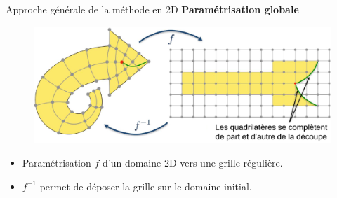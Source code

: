 
\begin{frame}{Approche générale de la méthode en 2D}
    \centering
    \textbf{Paramétrisation globale}
    
    
    \begin{figure}
        \includegraphics[width=1.\linewidth]{img/new_images/gp_arrow_ex.png}
    \end{figure}

    \begin{itemize}
        \item Paramétrisation $f$ d'un domaine 2D vers une grille régulière.
        \item $f^{-1}$ permet de déposer la grille sur le domaine initial.
    \end{itemize}
\end{frame}

